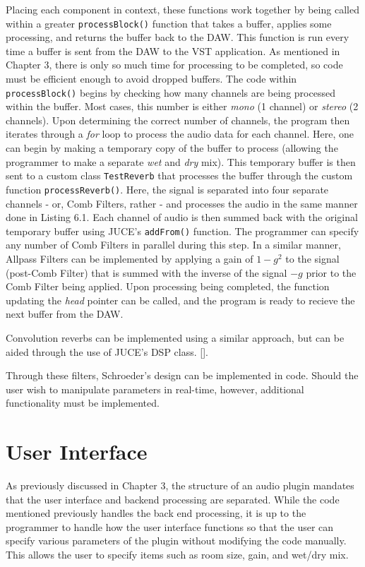 \begin{singlespace}

\end{singlespace} \hfill \break
\hspace*{0.6cm}Placing each component in context, these functions work together by being called within a greater \verb|processBlock()| function that takes a buffer, applies some processing, and returns the buffer back to the DAW. This function is run every time a buffer is sent from the DAW to the VST application. As mentioned in Chapter 3, there is only so much time for processing to be completed, so code must be efficient enough to avoid dropped buffers. The code within \verb|processBlock()| begins by checking how many channels are being processed within the buffer. Most cases, this number is either \textit{mono} (1 channel) or \textit{stereo} (2 channels). Upon determining the correct number of channels, the program then iterates through a \textit{for} loop to process the audio data for each channel. Here, one can begin by making a temporary copy of the buffer to process (allowing the programmer to make a separate \textit{wet} and \textit{dry} mix). This temporary buffer is then sent to a custom class \verb|TestReverb| that processes the buffer through the custom function \verb|processReverb()|. Here, the signal is separated into four separate channels - or, Comb Filters, rather - and processes the audio in the same manner done in Listing 6.1. Each channel of audio is then summed back with the original temporary buffer using JUCE's \verb|addFrom()| function. The programmer can specify any number of Comb Filters in parallel during this step. In a similar manner, Allpass Filters can be implemented by applying a gain of $1 - g^2$ to the signal (post-Comb Filter) that is summed with the inverse of the signal $-g$ prior to the Comb Filter being applied. Upon processing being completed, the function updating the \textit{head} pointer can be called, and the program is ready to recieve the next buffer from the DAW.

Convolution reverbs can be implemented using a similar approach, but can be aided through the use of JUCE's DSP class. [].


Through these filters, Schroeder's design can be implemented in code. Should the user wish to manipulate parameters in real-time, however, additional functionality must be implemented.

\section{User Interface}
As previously discussed in Chapter 3, the structure of an audio plugin mandates that the user interface and backend processing are separated. While the code mentioned previously handles the back end processing, it is up to the programmer to handle how the user interface functions so that the user can specify various parameters of the plugin without modifying the code manually. This allows the user to specify items such as room size, gain, and wet/dry mix.

